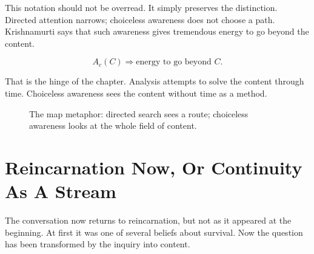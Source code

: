 This notation should not be overread. It simply preserves the distinction. Directed attention narrows; choiceless awareness does not choose a path. Krishnamurti says that such awareness gives tremendous energy to go beyond the content.

\begin{equation}
A_c(C)
\Rightarrow
\text{energy to go beyond } C.
\end{equation}

That is the hinge of the chapter. Analysis attempts to solve the content through time. Choiceless awareness sees the content without time as a method.

\begin{figure}
\centering
{}
\caption{The map metaphor: directed search sees a route; choiceless awareness looks at the whole field of content.}
\end{figure}

\section{Reincarnation Now, Or Continuity As A Stream}

The conversation now returns to reincarnation, but not as it appeared at the beginning. At first it was one of several beliefs about survival. Now the question has been transformed by the inquiry into content.

